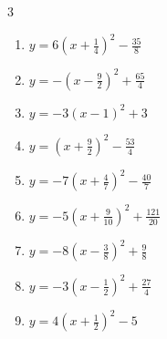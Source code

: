 \begin{multicols}{3}
\begin{enumerate}

  \item $\displaystyle y=6\left( x+\frac{1}{4}\right)^{2}-\frac{35}{8}$


  \item $\displaystyle y=-\left( x-\frac{9}{2}\right)^{2}+\frac{65}{4}$


  \item $\displaystyle y=-3\left( x-1\right)^{2}+3$

        \phantom{$\displaystyle 頂点\left( 1 , 3 \right)$}

\columnbreak %

\resetques

  \item $\displaystyle y=\left( x+\frac{9}{2}\right)^{2}-\frac{53}{4}$


  \item $\displaystyle y=-7\left( x+\frac{4}{7}\right)^{2}-\frac{40}{7}$


  \item $\displaystyle y=-5\left( x+\frac{9}{10}\right)^{2}+\frac{121}{20}$


  \item $\displaystyle y=-8\left( x-\frac{3}{8}\right)^{2}+\frac{9}{8}$


  \item $\displaystyle y=-3\left( x-\frac{1}{2}\right)^{2}+\frac{27}{4}$


  \item $\displaystyle y=4\left( x+\frac{1}{2}\right)^{2}-5$



\end{enumerate}
\end{multicols}
